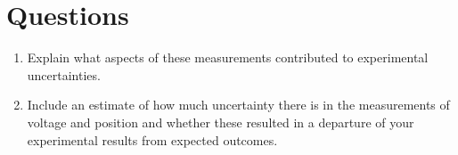\section{Questions}
\begin{enumerate}
	 \item Explain what aspects of these measurements contributed to experimental uncertainties.
	 \item Include an estimate of how much uncertainty there is in the measurements of voltage and position and whether these resulted in a departure of your experimental results from expected outcomes.
\end{enumerate}


\endinput

